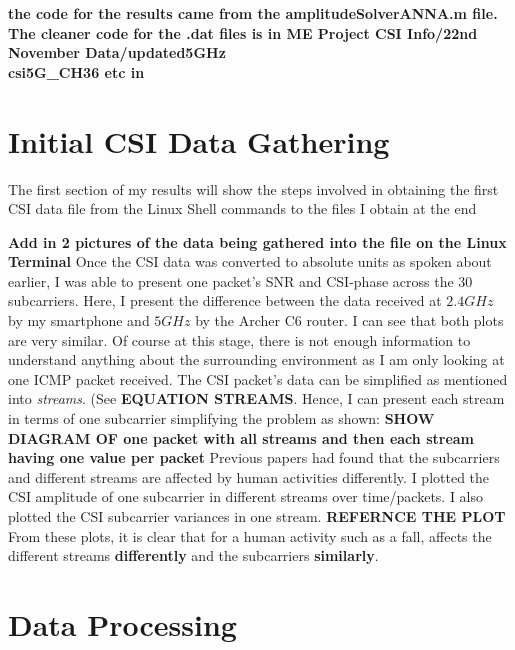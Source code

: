 \textbf{the code for the results came from the amplitudeSolverANNA.m file. The cleaner code for the .dat files is in ME Project CSI Info/22nd November Data/updated5GHz \\ csi5G\_CH36 etc in }
\section{Initial CSI Data Gathering}
The first section of my results will show the steps involved in obtaining the first CSI data file from the Linux Shell commands to the files I obtain at the end \par
\textbf{Add in 2 pictures of the data being gathered into the file on the Linux Terminal}
Once the CSI data was converted to absolute units as spoken about earlier, I was able to present one packet's SNR and CSI-phase across the 30 subcarriers.
Here, I present the difference between the data received at $2.4GHz$ by my smartphone and $5GHz$ by the Archer C6 router. I can see that both plots are very similar. Of course at this stage, there is not enough information to understand anything about the surrounding environment as I am only looking at one ICMP packet received. The CSI packet's data can be simplified as mentioned into \textit{streams}. (See \textbf{EQUATION STREAMS}. Hence, I can present each stream in terms of one subcarrier simplifying the problem as shown: \textbf{SHOW DIAGRAM OF one packet with all streams and then each stream having one value per packet}
Previous papers had found that the subcarriers and different streams are affected by human activities differently. I plotted the CSI amplitude of one subcarrier in different streams over time/packets. I also plotted the CSI subcarrier variances in one stream. \textbf{REFERNCE THE PLOT} From these plots, it is clear that for a human activity such as a fall, affects the different streams \textbf{differently} and the subcarriers \textbf{similarly}. 
\section{Data Processing}
